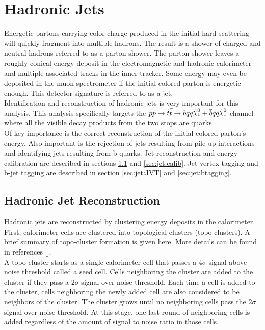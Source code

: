 \section{Hadronic Jets}
\label{sec:reco:jets}

\indent Energetic partons carrying color charge produced in the initial hard scattering will quickly fragment into multiple hadrons.  The result is a shower of charged and neutral hadrons referred to as a parton shower.  The parton shower leaves a roughly conical energy deposit in the electromagnetic and hadronic calorimeter and multiple associated tracks in the inner tracker.  Some energy may even be deposited in the muon spectrometer if the initial colored parton is energetic enough.  This detector signature is referred to as a jet. \\

\indent Identification and reconstruction of hadronic jets is very important for this analysis.  This analysis specifically targets the $pp \rightarrow \stop\bar{\stop} \rightarrow bqq\ninoone+\bar{b}\bar{q}\bar{q}\ninoone$ channel where all the visible decay products from the two stops are quarks.  \\

\indent Of key importance is the correct reconstruction of the initial colored parton's energy.  Also important is the rejection of jets resulting from pile-up interactions and identifying jets resulting from b-quarks.  Jet reconstruction and energy calibration are described in sections \ref{sec:jet:reco} and \ref{sec:jet:calib}.  Jet vertex tagging and b-jet tagging are described in section \ref{sec:jet:JVT} and \ref{sec:jet:btagging}. \\

\subsection{Hadronic Jet Reconstruction}
\label{sec:jet:reco}

\indent Hadronic jets are reconstructed by clustering energy deposits in the calorimeter. First, calorimeter cells are clustered into topological clusters (topo-clusters). A brief summary of topo-cluster formation is given here.  More details can be found in references [\cite{jetReco7TeV,jetReco13TeV}].  \\

\indent A topo-cluster starts as a single calorimeter cell that passes a $4\sigma$ signal above noise threshold called a seed cell.  Cells neighboring the cluster are added to the cluster if they pass a $2\sigma$ signal over noise threshold.  Each time a cell is added to the cluster, cells neighboring the newly added cell are also considered to be neighbors of the cluster.  The cluster grows until no neighboring cells pass the $2\sigma$ signal over noise threshold.  At this stage, one last round of neighboring cells is added regardless of the amount of signal to noise ratio in those cells. \\

